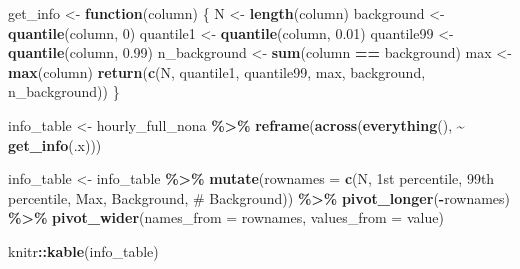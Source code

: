 \documentclass[
]{article}
\newenvironment{Shaded}{\begin{snugshade}}{\end{snugshade}}
\newcommand{\AttributeTok}[1]{\textcolor[rgb]{0.13,0.29,0.53}{#1}}
\newcommand{\ControlFlowTok}[1]{\textcolor[rgb]{0.13,0.29,0.53}{\textbf{#1}}}
\newcommand{\DecValTok}[1]{\textcolor[rgb]{0.00,0.00,0.81}{#1}}
\newcommand{\FloatTok}[1]{\textcolor[rgb]{0.00,0.00,0.81}{#1}}
\newcommand{\FunctionTok}[1]{\textcolor[rgb]{0.13,0.29,0.53}{\textbf{#1}}}
\newcommand{\NormalTok}[1]{#1}
\newcommand{\OtherTok}[1]{\textcolor[rgb]{0.56,0.35,0.01}{#1}}
\newcommand{\SpecialCharTok}[1]{\textcolor[rgb]{0.81,0.36,0.00}{\textbf{#1}}}
\newcommand{\StringTok}[1]{\textcolor[rgb]{0.31,0.60,0.02}{#1}}
\begin{document}
\begin{Shaded}
\begin{Highlighting}[]
\NormalTok{get\_info }\OtherTok{\textless{}{-}} \ControlFlowTok{function}\NormalTok{(column) \{}
\NormalTok{  N }\OtherTok{\textless{}{-}} \FunctionTok{length}\NormalTok{(column)}
\NormalTok{  background }\OtherTok{\textless{}{-}} \FunctionTok{quantile}\NormalTok{(column, }\DecValTok{0}\NormalTok{)}
\NormalTok{  quantile1 }\OtherTok{\textless{}{-}} \FunctionTok{quantile}\NormalTok{(column, }\FloatTok{0.01}\NormalTok{)}
\NormalTok{  quantile99 }\OtherTok{\textless{}{-}} \FunctionTok{quantile}\NormalTok{(column, }\FloatTok{0.99}\NormalTok{)}
\NormalTok{  n\_background }\OtherTok{\textless{}{-}} \FunctionTok{sum}\NormalTok{(column }\SpecialCharTok{==}\NormalTok{ background)}
\NormalTok{  max }\OtherTok{\textless{}{-}} \FunctionTok{max}\NormalTok{(column)}
  \FunctionTok{return}\NormalTok{(}\FunctionTok{c}\NormalTok{(N, quantile1, quantile99, max, background, n\_background))}
\NormalTok{\}}

\NormalTok{info\_table }\OtherTok{\textless{}{-}}\NormalTok{ hourly\_full\_nona }\SpecialCharTok{\%\textgreater{}\%}
  \FunctionTok{reframe}\NormalTok{(}\FunctionTok{across}\NormalTok{(}\FunctionTok{everything}\NormalTok{(), }\SpecialCharTok{\textasciitilde{}} \FunctionTok{get\_info}\NormalTok{(.x)))}

\NormalTok{info\_table }\OtherTok{\textless{}{-}}\NormalTok{ info\_table }\SpecialCharTok{\%\textgreater{}\%}  
  \FunctionTok{mutate}\NormalTok{(}\AttributeTok{rownames =} \FunctionTok{c}\NormalTok{(}\StringTok{\textquotesingle{}N\textquotesingle{}}\NormalTok{, }\StringTok{\textquotesingle{}1st percentile\textquotesingle{}}\NormalTok{, }\StringTok{\textquotesingle{}99th percentile\textquotesingle{}}\NormalTok{, }\StringTok{\textquotesingle{}Max\textquotesingle{}}\NormalTok{, }
                      \StringTok{\textquotesingle{}Background\textquotesingle{}}\NormalTok{, }\StringTok{\textquotesingle{}\# Background\textquotesingle{}}\NormalTok{)) }\SpecialCharTok{\%\textgreater{}\%}
  \FunctionTok{pivot\_longer}\NormalTok{(}\SpecialCharTok{{-}}\NormalTok{rownames) }\SpecialCharTok{\%\textgreater{}\%}   
  \FunctionTok{pivot\_wider}\NormalTok{(}\AttributeTok{names\_from =}\NormalTok{ rownames, }\AttributeTok{values\_from =}\NormalTok{ value) }

\NormalTok{knitr}\SpecialCharTok{::}\FunctionTok{kable}\NormalTok{(info\_table)}
\end{Highlighting}
\end{Shaded}
\end{document}
